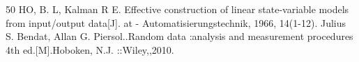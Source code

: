 \newpage
{}
\renewcommand{\refname}{参考文献}
\begin{thebibliography}{50}
HO, B. L, Kalman R E. Effective construction of linear state-variable models from input/output data[J]. at - Automatisierungstechnik, 1966, 14(1-12).
Julius S. Bendat, Allan G. Piersol..Random data  :analysis and measurement procedures  4th ed.[M].Hoboken, N.J. ::Wiley,,2010.
\end{thebibliography}
